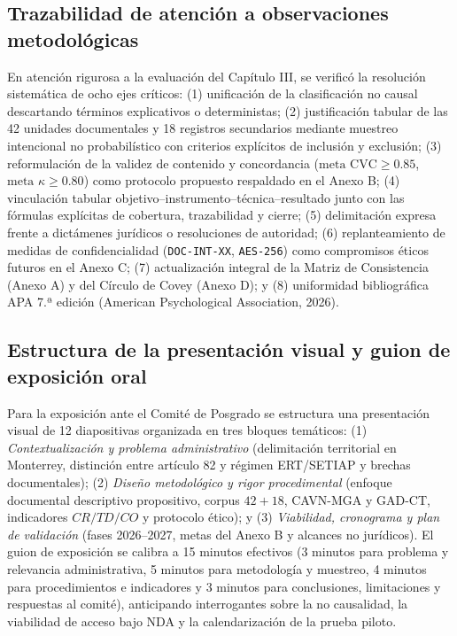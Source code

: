 {\subsection{Trazabilidad de atención a observaciones metodológicas}
En atención rigurosa a la evaluación del Capítulo III, se verificó la resolución sistemática de ocho ejes críticos: (1) unificación de la clasificación no causal descartando términos explicativos o deterministas; (2) justificación tabular de las 42 unidades documentales y 18 registros secundarios mediante muestreo intencional no probabilístico con criterios explícitos de inclusión y exclusión; (3) reformulación de la validez de contenido y concordancia ($\text{meta CVC} \ge 0.85$, $\text{meta }\kappa \ge 0.80$) como protocolo propuesto respaldado en el Anexo B; (4) vinculación tabular objetivo--instrumento--técnica--resultado junto con las fórmulas explícitas de cobertura, trazabilidad y cierre; (5) delimitación expresa frente a dictámenes jurídicos o resoluciones de autoridad; (6) replanteamiento de medidas de confidencialidad (\texttt{DOC-INT-XX}, \texttt{AES-256}) como compromisos éticos futuros en el Anexo C; (7) actualización integral de la Matriz de Consistencia (Anexo A) y del Círculo de Covey (Anexo D); y (8) uniformidad bibliográfica APA 7.ª edición (American Psychological Association, 2026).

\subsection{Estructura de la presentación visual y guion de exposición oral}
Para la exposición ante el Comité de Posgrado se estructura una presentación visual de 12 diapositivas organizada en tres bloques temáticos: (1) \textit{Contextualización y problema administrativo} (delimitación territorial en Monterrey, distinción entre artículo 82 y régimen ERT/SETIAP y brechas documentales); (2) \textit{Diseño metodológico y rigor procedimental} (enfoque documental descriptivo propositivo, corpus $42+18$, CAVN-MGA y GAD-CT, indicadores $CR/TD/CO$ y protocolo ético); y (3) \textit{Viabilidad, cronograma y plan de validación} (fases 2026--2027, metas del Anexo B y alcances no jurídicos). El guion de exposición se calibra a 15 minutos efectivos (3 minutos para problema y relevancia administrativa, 5 minutos para metodología y muestreo, 4 minutos para procedimientos e indicadores y 3 minutos para conclusiones, limitaciones y respuestas al comité), anticipando interrogantes sobre la no causalidad, la viabilidad de acceso bajo NDA y la calendarización de la prueba piloto.

}
